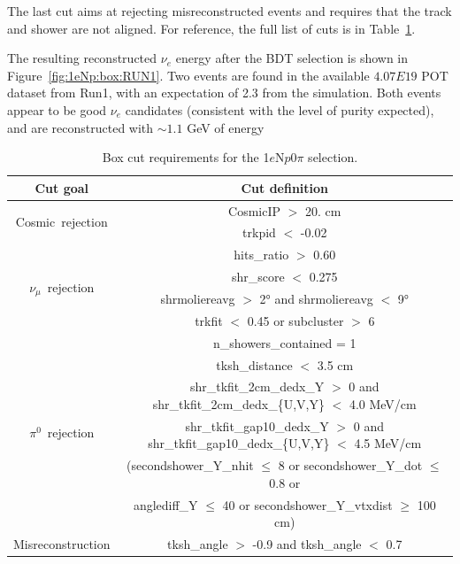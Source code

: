 \documentclass[a4paper]{article}
\newcommand{\nue}{$\nu_e$ }
\newcommand{\npsel}{1$e$N$p$0$\pi$ }
\begin{document}
The last cut aims at rejecting misreconstructed events and requires that the track and shower are not aligned. For reference, the full list of cuts is in Table~\ref{tab:1eNp:boxcut}.

The resulting reconstructed \nue energy after the BDT selection is shown in Figure~\ref{fig:1eNp:box:RUN1}. Two events are found in the available $4.07E19$ POT dataset from Run1, with an expectation of 2.3 from the simulation. Both events appear to be good $\nu_e$ candidates (consistent with the level of purity expected), and are reconstructed with $\sim 1.1$ GeV of energy

\begin{table}[h!]
\centering
\setlength{\tabcolsep}{10pt}
\renewcommand{\arraystretch}{1.25}
 \begin{tabular}{| c | c |} 
 \hline
 Cut goal & Cut definition \\
 \hline\hline
\multirow{2}{*}{Cosmic~rejection} & CosmicIP $>$ 20. \si{\cm} \\
& trkpid $<$ -0.02 \\
 \hline
\multirow{4}{*}{$\nu_\mu$~rejection} & hits\_ratio $>$ 0.60 \\
 & shr\_score $<$ 0.275 \\
& shrmoliereavg $>$ 2\si{\degree} and shrmoliereavg $<$ 9\si{\degree} \\
& trkfit $<$ 0.45 or subcluster $>$ 6 \\
 \hline
\multirow{6}{*}{$\pi^0$~rejection} & n\_showers\_contained = 1 \\
& tksh\_distance $<$ 3.5 \si{\cm} \\
& shr\_tkfit\_2cm\_dedx\_Y $>$ 0 and shr\_tkfit\_2cm\_dedx\_\{U,V,Y\} $<$ 4.0 \si{\MeV}/\si{\cm} \\
& shr\_tkfit\_gap10\_dedx\_Y $>$ 0 and shr\_tkfit\_gap10\_dedx\_\{U,V,Y\} $<$ 4.5 \si{\MeV}/\si{\cm} \\
& (secondshower\_Y\_nhit $\leq$ 8 or secondshower\_Y\_dot $\leq$ 0.8 or \\
&  anglediff\_Y $\leq$ 40 or secondshower\_Y\_vtxdist $\geq$ 100 \si{\cm}) \\
 \hline
Misreconstruction & tksh\_angle $>$ -0.9 and tksh\_angle $<$ 0.7 \\
 \hline
 \end{tabular}
 \caption{\label{tab:1eNp:boxcut} Box cut requirements for the \npsel selection.}
\end{table}
\end{document}
